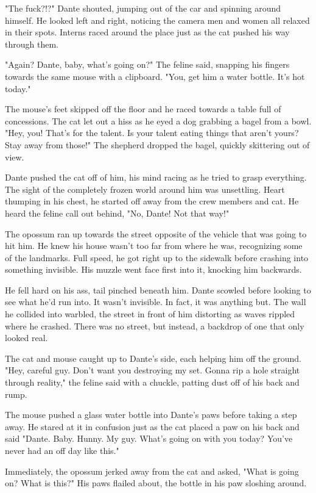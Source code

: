 "The fuck?!?" Dante shouted, jumping out of the car and spinning around himself. He looked left and right, noticing the camera men and women all relaxed in their spots. Interns raced around the place just as the cat pushed his way through them.

"Again? Dante, baby, what's going on?" The feline said, snapping his fingers towards the same mouse with a clipboard. "You, get him a water bottle. It's hot today."

The mouse's feet skipped off the floor and he raced towards a table full of concessions. The cat let out a hiss as he eyed a dog grabbing a bagel from a bowl. "Hey, you! That's for the talent. Is your talent eating things that aren't yours? Stay away from those!" The shepherd dropped the bagel, quickly skittering out of view.

Dante pushed the cat off of him, his mind racing as he tried to grasp everything. The sight of the completely frozen world around him was unsettling. Heart thumping in his chest, he started off away from the crew members and cat. He heard the feline call out behind, "No, Dante! Not that way!"

The opossum ran up towards the street opposite of the vehicle that was going to hit him. He knew his house wasn't too far from where he was, recognizing some of the landmarks. Full speed, he got right up to the sidewalk before crashing into something invisible. His muzzle went face first into it, knocking him backwards.

He fell hard on his ass, tail pinched beneath him. Dante scowled before looking to see what he'd run into. It wasn't invisible. In fact, it was anything but. The wall he collided into warbled, the street in front of him distorting as waves rippled where he crashed. There was no street, but instead, a backdrop of one that only looked real.

The cat and mouse caught up to Dante's side, each helping him off the ground. "Hey, careful guy. Don't want you destroying my set. Gonna rip a hole straight through reality," the feline said with a chuckle, patting dust off of his back and rump.

The mouse pushed a glass water bottle into Dante's paws before taking a step away. He stared at it in confusion just as the cat placed a paw on his back and said "Dante. Baby. Hunny. My guy. What's going on with you today? You've never had an off day like this."

Immediately, the opossum jerked away from the cat and asked, "What is going on? What is this?" His paws flailed about, the bottle in his paw sloshing around.

